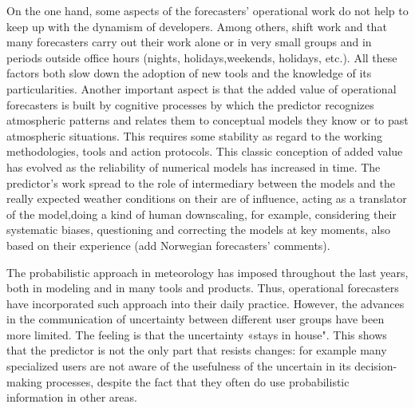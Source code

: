 \documentclass[twocol]{ametsocV5} %
\begin{document}
On the one hand, some aspects of the forecasters' operational work do not help to keep up with the dynamism of developers. Among others, shift work and that many forecasters carry out their work alone or in very small groups and in periods outside office hours (nights, holidays,weekends, holidays, etc.). All these factors both slow down the adoption of new tools and the knowledge of its particularities. Another important aspect is that the added value of operational forecasters is built by cognitive processes by which the predictor recognizes atmospheric patterns and relates them to conceptual models they know or to past atmospheric situations. This requires some stability as regard to the working methodologies, tools and action protocols. This classic conception of added value has evolved as the reliability of numerical models has increased in time. The predictor's work spread to the role of intermediary between the models and the really expected weather conditions on their are of influence, acting as a translator of the model,doing a kind of human downscaling, for example, considering their systematic biases, questioning and correcting the models at key moments, also based on their experience (add Norwegian forecasters' comments).

The probabilistic approach in meteorology has imposed throughout the last years, both in modeling and in many tools and products. Thus, operational forecasters have incorporated such approach into their daily practice. However, the advances in the communication of uncertainty between different user groups have been more limited. The feeling is that the uncertainty «stays in house". This shows that the predictor is not the only part that resists changes: for example many specialized users are not aware of the usefulness of the uncertain in its decision-making processes, despite the fact that they often do use probabilistic information in other areas. 
\end{document}
